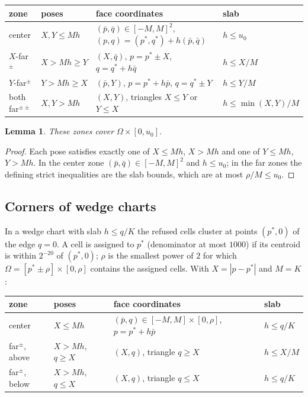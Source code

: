 \documentclass[11pt]{amsart}
\newtheorem{lemma}[theorem]{Lemma}
\theoremstyle{definition}
\theoremstyle{remark}
\begin{document}
\begin{center}
\begin{tabular}{llll}
\toprule
zone & poses & face coordinates & slab \\
\midrule
center & $X,Y\le Mh$ & $(\bar p,\bar q)\in[-M,M]^2$, $(p,q)=(p^*,q^*)+h(\bar p,\bar q)$ & $h\le u_0$\\
$X$-far$^\pm$ & $X>Mh\ge Y$ & $(X,\bar q)$, $p=p^*\pm X$, $q=q^*+h\bar q$ & $h\le X/M$\\
$Y$-far$^\pm$ & $Y>Mh\ge X$ & $(\bar p,Y)$, $p=p^*+h\bar p$, $q=q^*\pm Y$ & $h\le Y/M$\\
both far$^{\pm\pm}$ & $X,Y>Mh$ & $(X,Y)$, triangles $X\le Y$ or $Y\le X$ & $h\le\min(X,Y)/M$\\
\bottomrule
\end{tabular}
\end{center}

\begin{lemma}\label{lem:corner1}
These zones cover $\Omega\times[0,u_0]$.
\end{lemma}

\begin{proof}
Each pose satisfies exactly one of $X\le Mh$, $X>Mh$ and one of $Y\le Mh$, $Y>Mh$. In the center zone
$(\bar p,\bar q)\in[-M,M]^2$ and $h\le u_0$; in the far zones the defining strict inequalities are the slab bounds,
which are at most $\rho/M\le u_0$.
\end{proof}

\subsection{Corners of wedge charts}
In a wedge chart with slab $h\le q/K$ the refused cells cluster at points $(p^*,0)$ of the edge $q=0$. A cell is
assigned to $p^*$ (denominator at most $1000$) if its centroid is within $2^{-20}$ of $(p^*,0)$; $\rho$ is the smallest
power of $2$ for which $\Omega=[p^*\pm\rho]\times[0,\rho]$ contains the assigned cells. With $X=|p-p^*|$ and $M=K$:

\begin{center}
\begin{tabular}{llll}
\toprule
zone & poses & face coordinates & slab \\
\midrule
center & $X\le Mh$ & $(\bar p,q)\in[-M,M]\times[0,\rho]$, $p=p^*+h\bar p$ & $h\le q/K$\\
far$^\pm$, above & $X>Mh$, $q\ge X$ & $(X,q)$, triangle $q\ge X$ & $h\le X/M$\\
far$^\pm$, below & $X>Mh$, $q\le X$ & $(X,q)$, triangle $q\le X$ & $h\le q/K$\\
\bottomrule
\end{tabular}
\end{center}
\end{document}
